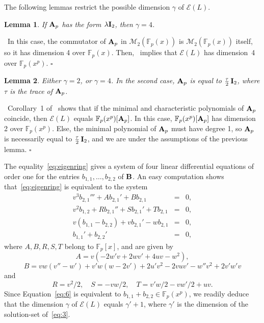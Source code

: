 \documentclass{sig-alternate}
\def\F {\mathbb{F}}
\def\mA {\ensuremath{{\bf A}}}
\def\mB {\ensuremath{{\bf B}}}
\def\mI {\ensuremath{{\bf I}}}
\def\myproof{\noindent{\sc Proof.}~}
\def\foorp{\hfill$\square$}
\newtheorem{Lemma}{Lemma}
\begin{document}
\smallskip{} The following
lemmas restrict the possible dimension $\gamma$ of $\mathcal{E}(L)$.

\begin{Lemma}\label{lemma:4.a}
  If $\mA_p$ has the form $\lambda \mI_2$, then $\gamma=4$.
\end{Lemma}
\myproof In this case, the commutator of $\mA_p$ in
$\mathscr{M}_2(\F_p(x))$ is $\mathscr{M}_2(\F_p(x))$ itself, so it has
dimension 4 over $\F_p(x)$. Then,~\cite[Prop.~3.5]{Cluzeau04} implies
that $\mathcal{E}(L)$ has dimension~4 over $\F_p(x^p)$. \foorp
 
\begin{Lemma}\label{lemma:4}
  Either $\gamma=2$, or $\gamma=4$. In the second case, $\mA_p$ is
  equal to $\frac{\tau}{2}\, \mI_2$, where $\tau$ is the trace of
  $\mA_p$.
\end{Lemma}
\myproof Corollary~1 of~\cite{Cluzeau04} shows that if the minimal and
characteristic polynomials of $\mA_p$ coincide, then $\mathcal{E}(L)$
equals $\F_p(x^p)[\mA_p]$. In this case, $\F_p(x^p)[\mA_p]$ has
dimension 2 over $\F_p(x^p)$.  Else, the minimal polynomial of $\mA_p$
must have degree 1, so $\mA_p$ is necessarily equal to
$\frac{\tau}{2}\, \mI_2$, and we are under the assumptions of the previous
lemma. \foorp

\smallskip{}
The equality~\eqref{eq:eigenring} gives a system of four linear
differential equations of order one for the entries
$b_{1,1},\dots,b_{2,2}$ of $\mB$. An easy computation shows
that~\eqref{eq:eigenring} is equivalent to the system
\begin{eqnarray}\label{eq:3}
v^3 b_{2,1}''' + A b_{2,1}' + B b_{2,1} &=& 0,\\ \label{eq:4} 
v^2 b_{1,2} + R b_{2,1}'' + S b_{2,1}' + T b_{2,1} &=& 0,\\  \label{eq:5}
v(b_{1,1}-b_{2,2}) + v b_{2,1}' -w b_{2,1} &=& 0,\\\label{eq:6}
b_{1,1}'+b_{2,2}' &=& 0, \label{eq:7} 
\end{eqnarray}
where $A,B,R,S,T$ belong to $\F_p[x]$, and are given by 
$$A=v(-2{w'}v+2w{v'}+4uv-w^2),$$
$$B=vw(v''-w')+
{v'}w(w-2v')+2u'v^2-2vu{v'}-{w''}v^2+2{v'}{w'}v$$ and
$$R = v^2/2, \quad S = -vw/2, \quad T = v' w/2 - v w'/2 + uv.$$
Since Equation~\eqref{eq:6} is equivalent to $b_{1,1}+b_{2,2} \in
\F_p(x^p)$, we readily deduce that the dimension $\gamma$ 
of $\mathcal{E}(L)$ equals $\gamma'+1$, where $\gamma'$
is the dimension of the solution-set of~\eqref{eq:3}.
\end{document}
